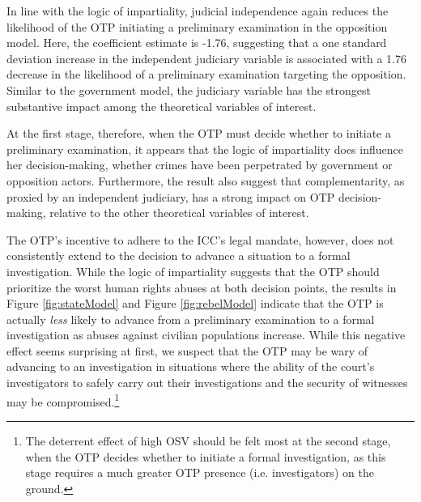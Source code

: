 In line with the logic of impartiality, judicial independence again reduces the likelihood of the OTP initiating a preliminary examination in the opposition model.  Here, the coefficient estimate is -1.76, suggesting that a one standard deviation increase in the independent judiciary variable is associated with a 1.76 decrease in the likelihood of a preliminary examination targeting the opposition. Similar to the government model, the judiciary variable has the strongest substantive impact among the theoretical variables of interest.

At the first stage, therefore, when the OTP must decide whether to initiate a preliminary examination, it appears that the logic of impartiality does influence her decision-making, whether crimes have been perpetrated by government or opposition actors. Furthermore, the result also suggest that complementarity, as proxied by an independent judiciary, has a strong impact on OTP decision-making, relative to the other theoretical variables of interest.

The OTP's incentive to adhere to the ICC's legal mandate, however, does not consistently extend to the decision to advance a situation to a formal investigation. While the logic of impartiality suggests that the OTP should prioritize the worst human rights abuses at both decision points, the results in Figure \ref{fig:stateModel} and Figure \ref{fig:rebelModel} indicate that the OTP is actually \textit{less} likely to advance from a preliminary examination to a formal investigation as abuses against civilian populations increase. While this negative effect seems surprising at first, we suspect that the OTP may be wary of advancing to an investigation in situations where the ability of the court's investigators to safely carry out their investigations and the security of witnesses may be compromised.\footnote{The deterrent effect of high OSV should be felt most at the second stage, when the OTP decides whether to initiate a formal investigation, as this stage requires a much greater OTP presence (i.e. investigators) on the ground.}

